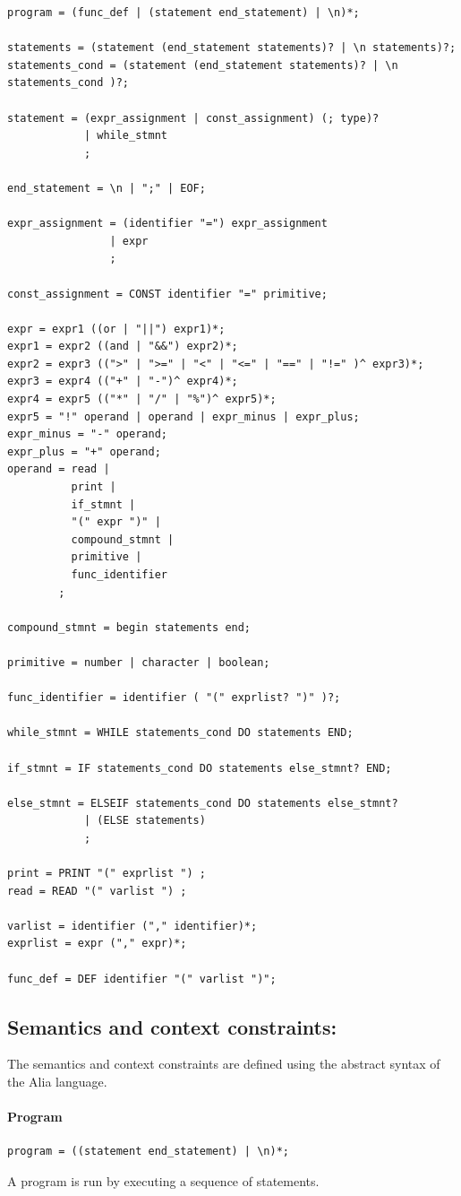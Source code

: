 \documentclass[paper=a4, fontsize=11pt]{article}
\numberwithin{equation}{section}		%
\numberwithin{figure}{section}			%
\numberwithin{table}{section}				%
\begin{document}
\begin{verbatim}
program = (func_def | (statement end_statement) | \n)*;

statements = (statement (end_statement statements)? | \n statements)?;
statements_cond = (statement (end_statement statements)? | \n statements_cond )?;

statement = (expr_assignment | const_assignment) (; type)?
			| while_stmnt 
			;

end_statement = \n | ";" | EOF;

expr_assignment = (identifier "=") expr_assignment
				| expr 
				;

const_assignment = CONST identifier "=" primitive;

expr = expr1 ((or | "||") expr1)*;
expr1 = expr2 ((and | "&&") expr2)*;
expr2 = expr3 ((">" | ">=" | "<" | "<=" | "==" | "!=" )^ expr3)*;
expr3 = expr4 (("+" | "-")^ expr4)*;
expr4 = expr5 (("*" | "/" | "%")^ expr5)*;
expr5 = "!" operand | operand | expr_minus | expr_plus;
expr_minus = "-" operand;
expr_plus = "+" operand;
operand = read |
	   	  print |
	   	  if_stmnt |
	   	  "(" expr ")" |
	   	  compound_stmnt |
	   	  primitive |
	   	  func_identifier
		;
		  
compound_stmnt = begin statements end;

primitive = number | character | boolean;

func_identifier = identifier ( "(" exprlist? ")" )?;

while_stmnt = WHILE statements_cond DO statements END;

if_stmnt = IF statements_cond DO statements else_stmnt? END;

else_stmnt = ELSEIF statements_cond DO statements else_stmnt?
			| (ELSE statements)
			;

print = PRINT "(" exprlist ") ;
read = READ "(" varlist ") ;

varlist = identifier ("," identifier)*;
exprlist = expr ("," expr)*;

func_def = DEF identifier "(" varlist ")";
\end{verbatim}


\subsection{Semantics and context constraints:}
The semantics and context constraints are defined using the abstract syntax of the Alia language.
\paragraph{Program}
\begin{verbatim}
program = ((statement end_statement) | \n)*;
\end{verbatim}
A program is run by executing a sequence of statements.
\end{document}
